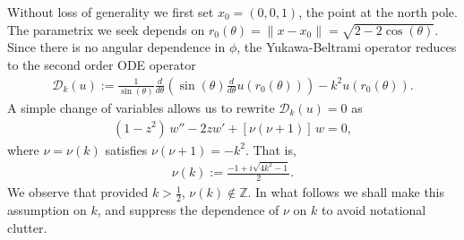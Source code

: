 \documentclass[final]{siamltex}
\begin{document}
 Without loss of generality we first set $x_{0}=(0,0,1)$, the point at the north pole. 
The parametrix we seek depends on $r_0(\theta)=\|x-x_0\|=\sqrt{2-2\cos(\theta)} $. Since there is no angular dependence in $\phi$, the Yukawa-Beltrami operator reduces to the second order ODE operator
\begin{align*}
\mathcal{D}_k(u):=\frac{1}{\sin(\theta)}\frac{d}{d\theta}\left(\sin(\theta)
\frac{d}{d\theta}u(r_0(\theta))\right)-k^2 u(r_{0}(\theta)).
\end{align*}
A simple change of variables allows us to rewrite $\mathcal{D}_k (u)=0$
as 
\begin{align}
  \label{LegendrePequation}
  (1-z^2)\,w'' -2zw' + \left[\nu(\nu+1)\right]\,w = 0,
\end{align}
where $\nu = \nu(k)$ satisfies $\nu(\nu + 1) = -k^2$. That is,
\begin{align*}  
  \nu(k):=\frac{-1+i\sqrt{4k^2-1}}{2}.
\end{align*}
We observe that provided $k>\frac{1}{2}$, $\nu(k) \notin \mathbb{Z}$. In
what follows we shall make this assumption on $k$, and suppress the
dependence of $\nu$ on $k$ to avoid notational clutter.
\end{document}
